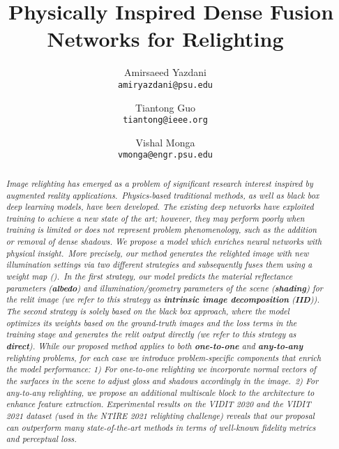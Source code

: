 \documentclass[final]{cvpr}
\newcommand{\squeezeup}{\vspace{-5mm}}
\begin{document}
\title{\ Physically Inspired Dense Fusion Networks for Relighting}



\author{Amirsaeed Yazdani\\
{\tt\small amiryazdani@psu.edu}
\and
Tiantong Guo\\
{\tt\small tiantong@ieee.org}
\and
Vishal Monga\\
{\tt\small vmonga@engr.psu.edu}
}








\maketitle
\squeezeup
\squeezeup
\squeezeup
\begin{abstract}
\squeezeup
\textit{Image relighting has emerged as a problem of significant research interest inspired by augmented reality applications.\ Physics-based traditional methods, as well as black box deep learning models, have been developed. The existing deep networks have exploited training to achieve a new state of the art; however, they may perform poorly when training is limited or does not represent problem phenomenology, such as the addition or removal of dense shadows.
We propose a model which enriches neural networks with physical insight.\ More precisely, our method generates the relighted image with new illumination settings via two different strategies and subsequently fuses them using a weight map ().\ In the first strategy, our model predicts the  material reflectance parameters (\textbf{albedo}) and illumination/geometry parameters of the scene (\textbf{shading}) for the relit image (we refer to this strategy as \textbf{intrinsic image decomposition} (\textbf{IID})). The second strategy is solely based on the black box approach, where the model optimizes its weights based on the ground-truth images and the loss terms in the training stage and generates the relit output directly (we refer to this strategy as \textbf{direct}). While our proposed method applies to both \textbf{one-to-one} and \textbf{any-to-any} relighting problems, for each case we introduce problem-specific components that enrich the model performance: 1) For one-to-one relighting we incorporate normal vectors of the surfaces in the scene to adjust gloss and shadows accordingly in the image.\ 2) For any-to-any relighting, we propose an additional multiscale block to the architecture to enhance feature extraction. Experimental results on the VIDIT 2020 and the VIDIT 2021 dataset (used in the NTIRE 2021 relighting challenge) reveals that our proposal can outperform many state-of-the-art methods in terms of well-known fidelity metrics and perceptual loss.}
\end{abstract}
\squeezeup
\end{document}
